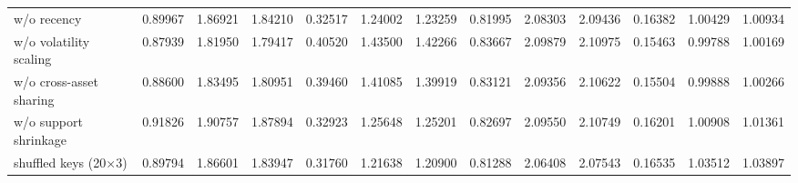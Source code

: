 \begin{table}[!t]
{\begin{tabular}{l|ccc|ccc|ccc|ccc}
w/o recency & 0.89967 & 1.86921 & 1.84210 & 0.32517 & 1.24002 & 1.23259 & 0.81995 & 2.08303 & 2.09436 & 0.16382 & 1.00429 & 1.00934 \\
w/o volatility scaling & 0.87939 & 1.81950 & 1.79417 & 0.40520 & 1.43500 & 1.42266 & 0.83667 & 2.09879 & 2.10975 & 0.15463 & 0.99788 & 1.00169 \\
w/o cross-asset sharing & 0.88600 & 1.83495 & 1.80951 & 0.39460 & 1.41085 & 1.39919 & 0.83121 & 2.09356 & 2.10622 & 0.15504 & 0.99888 & 1.00266 \\
w/o support shrinkage & 0.91826 & 1.90757 & 1.87894 & 0.32923 & 1.25648 & 1.25201 & 0.82697 & 2.09550 & 2.10749 & 0.16201 & 1.00908 & 1.01361 \\
shuffled keys (20$\times$3) & 0.89794 & 1.86601 & 1.83947 & 0.31760 & 1.21638 & 1.20900 & 0.81288 & 2.06408 & 2.07543 & 0.16535 & 1.03512 & 1.03897 \\
\bottomrule
\end{tabular}}
\end{table}
